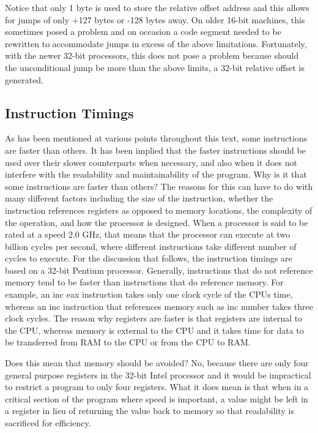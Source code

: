 \documentclass[10pt]{book}
\begin{document}
Notice that only 1 byte is used to store the relative offset address and this allows for jumps of only +127 bytes or -128 bytes away. On older 16-bit machines, this sometimes posed a problem and on occasion a code segment needed to be rewritten to accommodate jumps in excess of the above limitations. Fortunately, with the newer 32-bit processors, this does not pose a problem because should the unconditional jump be more than the above limits, a 32-bit relative offset is generated.

\subsection{Instruction Timings}
As has been mentioned at various points throughout this text, some instructions are faster than others. It has been implied that the faster instructions should be used over their slower counterparts when necessary, and also when it does not interfere with the readability and maintainability of the program. Why is it that some instructions are faster than others? The reasons for this can have to do with many different factors including the size of the instruction, whether the instruction references registers as opposed to memory locations, the complexity of the operation, and how the processor is designed. When a processor is said to be rated at a speed 2.0 GHz, that means that the processor can execute at two billion cycles per second, where different instructions take different number of cycles to execute. For the discussion that follows, the instruction timings are based on a 32-bit Pentium processor.
Generally, instructions that do not reference memory tend to be faster than instructions that do reference memory. For example, an inc eax instruction takes only one clock cycle of the CPUs time, whereas an inc instruction that references memory such as inc number takes three clock cycles. The reason why registers are faster is that registers are internal to the CPU, whereas memory is external to the CPU and it takes time for data to be transferred from RAM to the CPU or from the CPU to RAM.

Does this mean that memory should be avoided? No, because there are only four general purpose registers in the 32-bit Intel processor and it would be impractical to restrict a program to only four registers. What it does mean is that when in a critical section of the program where speed is important, a value might be left in a register in lieu of returning the value back to memory so that readability is sacrificed for efficiency.
\end{document}
